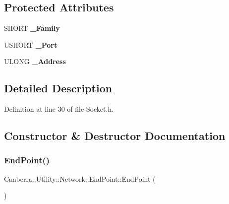 \subsection*{Protected Attributes}
\begin{DoxyCompactItemize}
\item 
\mbox{\label{class_canberra_1_1_utility_1_1_network_1_1_end_point_ac8de94eb6a3202681f21994906186d2d}} 
S\+H\+O\+RT {\bfseries \+\_\+\+Family}
\item 
\mbox{\label{class_canberra_1_1_utility_1_1_network_1_1_end_point_a274c38b9250201aa5680e6335f9208de}} 
U\+S\+H\+O\+RT {\bfseries \+\_\+\+Port}
\item 
\mbox{\label{class_canberra_1_1_utility_1_1_network_1_1_end_point_a6d3f3b0618e6f2b829d4626b28a37f4f}} 
U\+L\+O\+NG {\bfseries \+\_\+\+Address}
\end{DoxyCompactItemize}


\subsection{Detailed Description}


Definition at line 30 of file Socket.\+h.



\subsection{Constructor \& Destructor Documentation}
\mbox{\label{class_canberra_1_1_utility_1_1_network_1_1_end_point_a7703ea225c0604da4a5b20d89b95094f_a7703ea225c0604da4a5b20d89b95094f}} 
\subsubsection{\texorpdfstring{End\+Point()}{EndPoint()}\hspace{0.1cm}{\footnotesize\ttfamily [1/2]}}
{\footnotesize\ttfamily Canberra\+::\+Utility\+::\+Network\+::\+End\+Point\+::\+End\+Point (\begin{DoxyParamCaption}{ }\end{DoxyParamCaption})}

